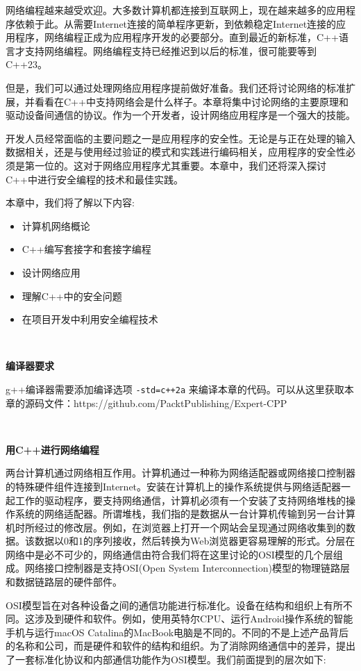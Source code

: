 网络编程越来越受欢迎。大多数计算机都连接到互联网上，现在越来越多的应用程序依赖于此。从需要Internet连接的简单程序更新，到依赖稳定Internet连接的应用程序，网络编程正成为应用程序开发的必要部分。直到最近的新标准，C++语言才支持网络编程。网络编程支持已经推迟到以后的标准，很可能要等到C++23。 \par
但是，我们可以通过处理网络应用程序提前做好准备。我们还将讨论网络的标准扩展，并看看在C++中支持网络会是什么样子。本章将集中讨论网络的主要原理和驱动设备间通信的协议。作为一个开发者，设计网络应用程序是一个强大的技能。 \par
开发人员经常面临的主要问题之一是应用程序的安全性。无论是与正在处理的输入数据相关，还是与使用经过验证的模式和实践进行编码相关，应用程序的安全性必须是第一位的。这对于网络应用程序尤其重要。本章中，我们还将深入探讨C++中进行安全编程的技术和最佳实践。 \par

本章中，我们将了解以下内容: \par

\begin{itemize}
	\item 计算机网络概论
	\item C++编写套接字和套接字编程
	\item 设计网络应用
	\item 理解C++中的安全问题
	\item 在项目开发中利用安全编程技术
\end{itemize}

\noindent\textbf{}\ \par
\textbf{编译器要求} \ \par
g++编译器需要添加编译选项 \texttt{-std=c++2a} 来编译本章的代码。可以从这里获取本章的源码文件：https:/​/github.​com/PacktPublishing/Expert-CPP \par

\noindent\textbf{}\ \par
\textbf{用C++进行网络编程} \ \par
两台计算机通过网络相互作用。计算机通过一种称为网络适配器或网络接口控制器的特殊硬件组件连接到Internet。安装在计算机上的操作系统提供与网络适配器一起工作的驱动程序，要支持网络通信，计算机必须有一个安装了支持网络堆栈的操作系统的网络适配器。所谓堆栈，我们指的是数据从一台计算机传输到另一台计算机时所经过的修改层。例如，在浏览器上打开一个网站会呈现通过网络收集到的数据。该数据以0和1的序列接收，然后转换为Web浏览器更容易理解的形式。分层在网络中是必不可少的，网络通信由符合我们将在这里讨论的OSI模型的几个层组成。网络接口控制器是支持OSI(Open System Interconnection)模型的物理链路层和数据链路层的硬件部件。 \par
OSI模型旨在对各种设备之间的通信功能进行标准化。设备在结构和组织上有所不同。这涉及到硬件和软件。例如，使用英特尔CPU、运行Android操作系统的智能手机与运行macOS Catalina的MacBook电脑是不同的。不同的不是上述产品背后的名称和公司，而是硬件和软件的结构和组织。为了消除网络通信中的差异，提出了一套标准化协议和内部通信功能作为OSI模型。我们前面提到的层次如下: \par

